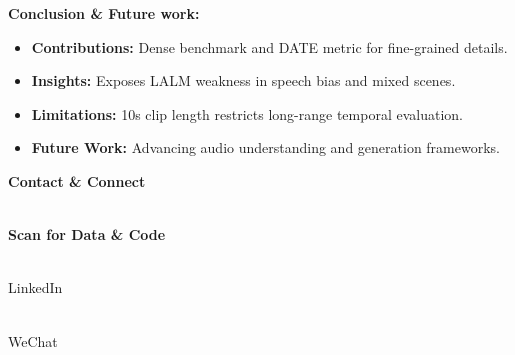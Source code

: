 \textbf{Conclusion \& Future work:}
\begin{itemize}
    \item \textbf{Contributions:} Dense benchmark and DATE metric for fine-grained details.
    \item \textbf{Insights:} Exposes LALM weakness in speech bias and mixed scenes.
    \item \textbf{Limitations:} 10s clip length restricts long-range temporal evaluation.
    \item \textbf{Future Work:} Advancing audio understanding and generation frameworks.
\end{itemize}

\vspace{0.6cm}
\textbf{Contact \& Connect}
\vspace{2.5cm}

\begin{center}
\begin{minipage}[c]{0.48\linewidth}
    \centering
    \qrcode{\PosterRepositoryUrl} \\
    \vspace{1.0 cm}
    \textbf{Scan for Data \& Code}
\end{minipage}
\hspace{-2.0cm}
\begin{minipage}[c]{0.45\linewidth}
    \centering
     \\
    \vspace{0.3cm}
    \small LinkedIn

    \vspace{1cm}
     \\
    \vspace{0.3cm}
    \small WeChat
\end{minipage}
\end{center}
